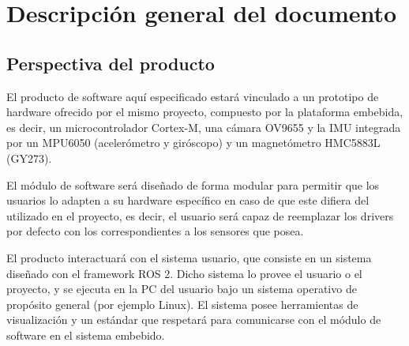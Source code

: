 \documentclass[12pt,a4paper, twosite]{article}
\begin{document}
\section{Descripción general del documento}
\label{sec:orgc1c4017}




\subsection{Perspectiva del producto}
\label{sec:org24980a8}


El producto de software aquí especificado estará vinculado a un prototipo de hardware
ofrecido por el mismo proyecto, compuesto por la plataforma embebida, es decir,
un microcontrolador Cortex-M, una cámara OV9655 y la IMU integrada por un MPU6050 (acelerómetro
y giróscopo) y un magnetómetro HMC5883L (GY273).

El módulo de software será diseñado de forma modular para permitir que los usuarios lo
adapten a su hardware específico en caso de que este difiera del utilizado en el proyecto, es decir, el usuario será capaz de reemplazar los drivers por defecto con los correspondientes a
los sensores que posea.

El producto interactuará con el sistema usuario, que consiste en un sistema diseñado con el
framework ROS 2. Dicho sistema lo provee el usuario o el proyecto, y se ejecuta en la PC del
usuario bajo un sistema operativo de propósito general (por ejemplo Linux). El sistema posee
herramientas de visualización y un estándar que respetará para comunicarse con el módulo de 
software en el sistema embebido.
\end{document}
